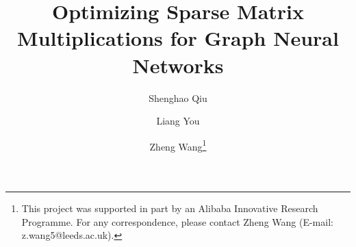 \documentclass[runningheads]{llncs}
\begin{document}
\title{Optimizing Sparse Matrix Multiplications for Graph Neural Networks}

\author{Shenghao Qiu \and
Liang You \and Zheng Wang\thanks{This project was supported in part by an Alibaba Innovative Research Programme.
 For any correspondence, please contact Zheng Wang (E-mail:
z.wang5@leeds.ac.uk).}}

\maketitle










%

\vspace{-5mm}


\end{document}
